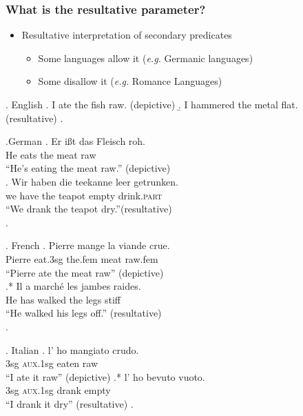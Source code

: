 \documentclass[Proposal]{subfiles}
\begin{document}
\begin{frame}
  \frametitle{What is the resultative parameter?}
  \begin{itemize}
    \item Resultative interpretation of secondary predicates
      \begin{itemize}
	\item<1-|handout:1-> Some languages allow it (\textit{e.g.} Germanic languages)
	\item<4-|handout:3-> Some disallow it (\textit{e.g.} Romance Languages)
      \end{itemize}
  \end{itemize}
  \begin{overprint}
    \ex. English
    \a. I ate the fish raw. (depictive)
    \b. I hammered the metal flat. (resultative)
    \z.

    \ex.German 
    \ag. Er i\ss{}t das Fleisch roh.\\
    He eats the meat raw\\
    ``He's eating the meat raw.'' (depictive)\\
    \parencite{muller2004analysis}
    \bg. Wir haben die teekanne leer getrunken.\\
    we have the teapot empty drink.\textsc{part}\\
    ``We drank the teapot dry.''(resultative)\\
    \parencite{kratzer_building_2004}
    \z.

    \ex. French
    \ag. Pierre mange la viande crue.\\
    Pierre eat.3sg the.fem meat raw.fem\\
    ``Pierre ate the meat raw'' (depictive)\\
    \parencite{legendre1997secondary}
    \bg.* Il a march\'e les jambes raides.\\
    He has walked the legs stiff\\
    ``He walked his legs off.'' (resultative)\\
    \parencite{washio1997resultatives}
    \z.

    \ex. Italian
    \ag. l' ho mangiato crudo.\\
    3sg \textsc{aux}.1sg eaten raw\\
    ``I ate it raw'' (depictive)
    \bg.* l' ho bevuto vuoto.\\
    3sg \textsc{aux}.1sg drank empty\\
    ``I drank it dry'' (resultative)
    \z.

  \end{overprint}
\end{frame}
\end{document}
